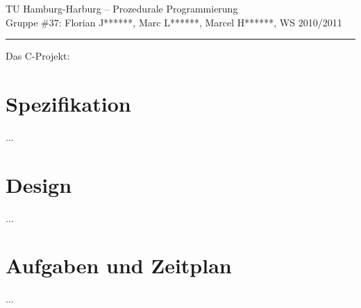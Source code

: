 \documentclass[11pt,a4paper,notitlepage]{report}
\begin{document}
	\begin{center}
		TU Hamburg-Harburg -- Prozedurale Programmierung \\
		Gruppe \#37: Florian J******, Marc L******, Marcel H******, WS 2010/2011
	\end{center}
	\rule{1.0\linewidth}{.1pt}
	\newline
	\begin{center}
		Das C-Projekt:
		\Huge
		\parbox{1.0\linewidth}{
		}
		\normalsize
	\end{center}
	\section*{Spezifikation}
	...
	\section*{Design}
	...
	\section*{Aufgaben und Zeitplan}
	...
\end{document}
